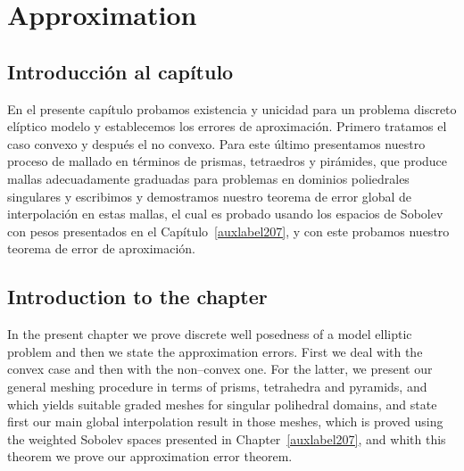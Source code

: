 \chapter{Approximation}\label{auxLabel100}
\section*{Introducci\'on al cap\'itulo}
En el presente cap\'itulo probamos existencia y unicidad
para un problema discreto el\'iptico modelo y establecemos
los errores de aproximaci\'on.
Primero tratamos el caso convexo y despu\'es el no convexo. 
Para este \'ultimo presentamos nuestro proceso de mallado
en t\'erminos de prismas, tetraedros y pir\'amides, que produce
mallas adecuadamente graduadas para problemas en dominios poliedrales singulares
y escribimos y demostramos nuestro teorema de error global de
interpolaci\'on en estas mallas, el cual es probado usando los espacios
de Sobolev con pesos presentados en el Cap\'itulo~\ref{auxlabel207},
y con este probamos nuestro teorema de error de aproximaci\'on.
\section*{Introduction to the chapter}
In the present chapter we prove
discrete well posedness of a model elliptic problem
and then we state the approximation errors.
First we deal with the convex case and then with the  non--convex
one. For the latter, we present our general meshing procedure
in terms of prisms, tetrahedra and pyramids, and which yields
suitable graded meshes for singular polihedral domains, 
and state first our main
global interpolation result in those meshes, which is proved using the 
weighted Sobolev spaces presented in Chapter~\ref{auxlabel207},
and whith this theorem we prove our approximation error theorem.





